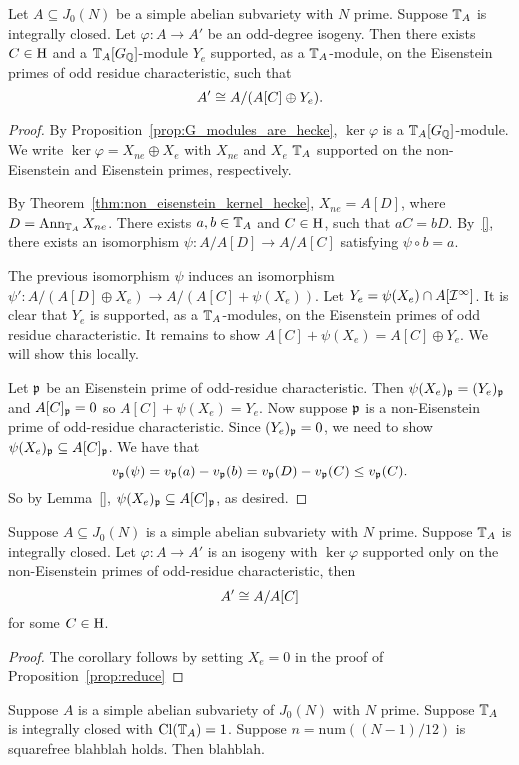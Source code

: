 \documentclass[thesis.tex]{subfiles}
\begin{document}
\begin{proposition}
    \label{prop:reduce}
    Let $A\subseteq J_0(N)$ be a simple abelian subvariety with $N$ prime.
    Suppose $\mathbb{T}_A$ is integrally closed. Let $\varphi:A\to A'$ be an
    odd-degree isogeny. Then there exists $C\in \operatorname{H}$ and a $\mathbb{T}_A[G_{\mathbb{Q}}]$-module
    $Y_e$ supported, as a $\mathbb{T}_A$-module, on the Eisenstein primes of odd
    residue characteristic, such that
    \[
        A'\cong A/(A[C]\oplus Y_e).
    \]
\end{proposition}
\begin{proof}
    By Proposition~\ref{prop:G_modules_are_hecke}, $\ker\varphi$ is a
    $\mathbb{T}_A[G_{\mathbb{Q}}]$-module. We write $\ker\varphi = X_{ne} \oplus X_e$ with
    $X_{ne}$ and $X_e$ $\mathbb{T}_A$ supported on the non-Eisenstein and Eisenstein
    primes, respectively.

    By Theorem~\ref{thm:non_eisenstein_kernel_hecke}, $X_{ne} = A[D]$, where
    $D=\operatorname{Ann}_{\mathbb{T}_A} X_{ne}$. There exists $a,b\in \mathbb{T}_A$ and $C\in \operatorname{H}$, such
    that $aC=bD$. By~\ref{}, there exists an isomorphism $\psi:A/A[D]\to
    A/A[C]$ satisfying $\psi \circ b = a$.

    The previous isomorphism $\psi$ induces an isomorphism $\psi':A/(A[D]\oplus
    X_e)\to A/(A[C] + \psi(X_e))$. Let $Y_e = \psi(X_e)\cap A[\mathcal{I}^\infty]$. It
    is clear that $Y_e$ is supported, as a $\mathbb{T}_A$-modules, on the Eisenstein
    primes of odd residue characteristic. It remains to show $A[C] + \psi(X_e)
    = A[C]\oplus Y_e$. We will show this locally.

    Let $\mathfrak{p}$ be an Eisenstein prime of odd-residue characteristic. Then
    $\psi(X_e)_{\mathfrak{p}} = (Y_e)_{\mathfrak{p}}$ and $A[C]_{\mathfrak{p}}=0$ so $A[C]+\psi(X_e)=Y_e$. Now
    suppose $\mathfrak{p}$ is a non-Eisenstein prime of odd-residue characteristic. Since
    $(Y_e)_{\mathfrak{p}} = 0$, we need to show $\psi(X_e)_{\mathfrak{p}} \subseteq A[C]_{\mathfrak{p}}$. We have
    that
    \[
        v_{\mathfrak{p}}(\psi) =  v_{\mathfrak{p}}(a)-v_{\mathfrak{p}}(b) = v_{\mathfrak{p}}(D) - v_{\mathfrak{p}}(C) \leq v_{\mathfrak{p}}(C).
    \] 
    So by Lemma~\ref{}, $\psi(X_e)_{\mathfrak{p}} \subseteq A[C]_{\mathfrak{p}}$, as desired.
\end{proof}

\begin{corollary}
    Suppose $A\subseteq J_0(N)$ is a simple abelian subvariety with $N$ prime.
    Suppose $\mathbb{T}_A$ is integrally closed. Let $\varphi:A\to A'$ is an isogeny
    with $\ker\varphi$ supported only on the non-Eisenstein primes of
    odd-residue characteristic, then
    \[
        A' \cong A/A[C]
    \]
    for some $C\in \operatorname{H}$.
\end{corollary}
\begin{proof}
    The corollary follows by setting $X_e=0$ in the proof of
    Proposition~\ref{prop:reduce}
\end{proof}

\begin{corollary}
    Suppose $A$ is a simple abelian subvariety of $J_0(N)$ with $N$ prime.
    Suppose $\mathbb{T}_A$ is integrally closed with $\operatorname{Cl}(\mathbb{T}_A) = 1$. Suppose
    $n=\mathrm{num}((N-1)/12)$ is squarefree blahblah holds. Then
    blahblah.
\end{corollary}
\end{document}
